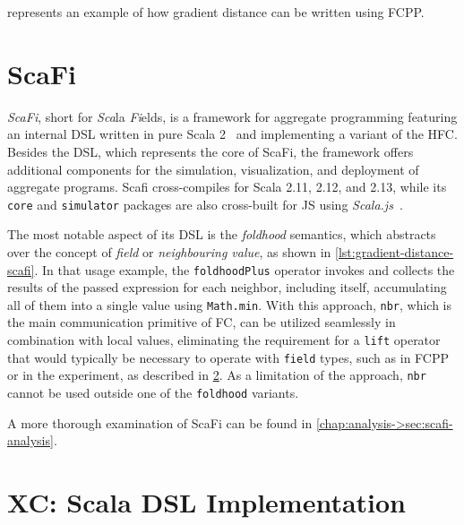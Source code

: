  represents an example of how gradient distance can be written using FCPP.




\section{ScaFi} \label{chap:state-of-the-art->sec:scafi}

\textit{ScaFi}, short for \textit{Sca}la \textit{Fi}elds, is a framework for aggregate programming featuring an internal \ac{DSL} written in pure Scala 2~\cite{scafi} and implementing a variant of the \ac{HFC}.
%
Besides the \ac{DSL}, which represents the core of ScaFi, the framework offers additional components for the simulation, visualization, and deployment of aggregate programs.
%
Scafi cross-compiles for Scala 2.11, 2.12, and 2.13, while its \texttt{core} and \texttt{simulator} packages are also cross-built for \ac{JS} using \textit{Scala.js}~\cite{scala-js}.

The most notable aspect of its \ac{DSL} is the \textit{foldhood} semantics, which abstracts over the concept of \textit{field} or \textit{neighbouring value}, as shown in \cref{lst:gradient-distance-scafi}.
%
In that usage example, the \texttt{foldhoodPlus} operator invokes and collects the results of the passed expression for each neighbor, including itself, accumulating all of them into a single value using \texttt{Math.min}.
%
With this approach, \texttt{nbr}, which is the main communication primitive of \ac{FC}, can be utilized seamlessly in combination with local values, eliminating the requirement for a \texttt{lift} operator that would typically be necessary to operate with \texttt{field} types, such as in FCPP or in the  experiment, as described in \cref{chap:state-of-the-art->sec:xc-experiment}.
%
As a limitation of the approach, \texttt{nbr} cannot be used outside one of the \texttt{foldhood} variants.



A more thorough examination of ScaFi can be found in \cref{chap:analysis->sec:scafi-analysis}.

\section{XC: Scala DSL Implementation} \label{chap:state-of-the-art->sec:xc-experiment}

